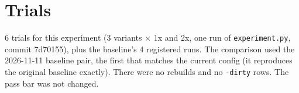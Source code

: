 \documentclass{article}
\begin{document}
\section{Trials}

6 trials for this experiment (3 variants \ensuremath{\times} 1x and 2x, one run of \texttt{experiment.\allowbreak{}py}, commit 7d70155), plus the baseline's 4 registered runs. The comparison used the 2026-11-11 baseline pair, the first that matches the current config (it reproduces the original baseline exactly). There were no rebuilds and no \texttt{-\allowbreak{}dirty} rows. The pass bar was not changed.
\end{document}
